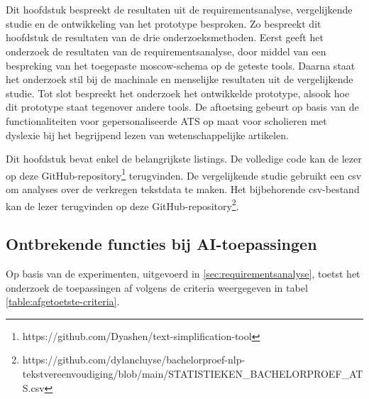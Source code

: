 \chapter{}%
\label{ch:resultaten}

Dit hoofdstuk bespreekt de resultaten uit de requirementsanalyse, vergelijkende studie en de ontwikkeling van het prototype besproken. Zo bespreekt dit hoofdstuk de resultaten van de drie onderzoeksmethoden. Eerst geeft het onderzoek de resultaten van de requirementsanalyse, door middel van een bespreking van het toegepaste moscow-schema op de geteste tools. Daarna staat het onderzoek stil bij de machinale en menselijke resultaten uit de vergelijkende studie. Tot slot bespreekt het onderzoek het ontwikkelde prototype, alsook hoe dit prototype staat tegenover andere tools. De aftoetsing gebeurt op basis van de functionaliteiten voor gepersonaliseerde ATS op maat voor scholieren met dyslexie bij het begrijpend lezen van wetenschappelijke artikelen. 

Dit hoofdstuk bevat enkel de belangrijkste listings. De volledige code kan de lezer op deze GitHub-repository\footnote{https://github.com/Dyashen/text-simplification-tool} terugvinden. De vergelijkende studie gebruikt een csv om analyses over de verkregen tekstdata te maken. Het bijbehorende csv-bestand kan de lezer terugvinden op deze GitHub-repository\footnote{https://github.com/dylancluyse/bachelorproef-nlp-tekstvereenvoudiging/blob/main/STATISTIEKEN\_BACHELORPROEF\_ATS.csv}.

\section{Ontbrekende functies bij AI-toepassingen}

Op basis van de experimenten, uitgevoerd in \ref{sec:requirementsanalyse}, toetst het onderzoek de toepassingen af volgens de criteria weergegeven in tabel \ref{table:afgetoetste-criteria}.

